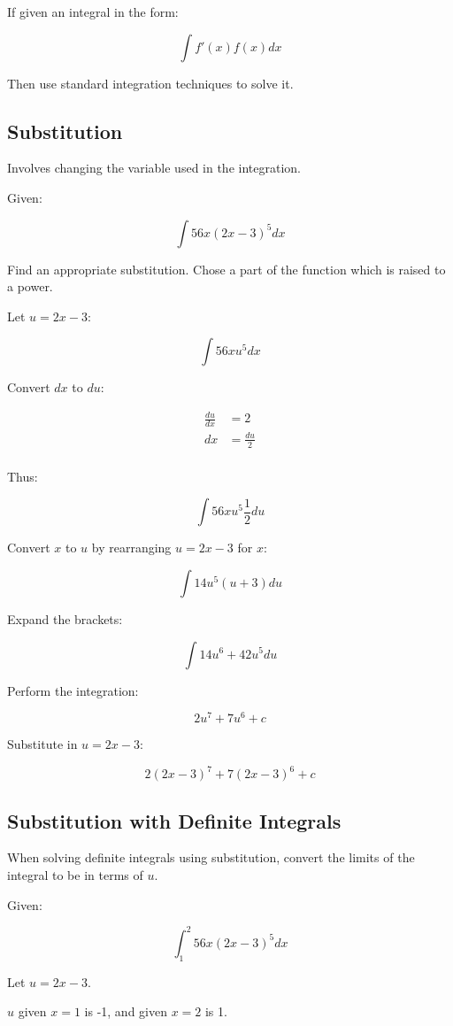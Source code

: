 \documentclass[a4paper,11pt]{article}
\begin{document}
If given an integral in the form:

$$
\int f'(x) f(x) dx
$$

Then use standard integration techniques to solve it.


\subsection{Substitution}

Involves changing the variable used in the integration.

Given:

$$
\int 56x(2x - 3)^5 dx
$$

Find an appropriate substitution. Chose a part of the function which is raised
to a power.

Let $u = 2x - 3$:

$$
\int 56xu^5 dx
$$

Convert $dx$ to $du$:

$$
\begin{aligned}
\frac{du}{dx} & = 2 \\
dx & = \frac{du}{2} \\
\end{aligned}
$$

Thus:

$$
\int 56xu^5 \frac{1}{2} du
$$

Convert $x$ to $u$ by rearranging $u = 2x - 3$ for $x$:

$$
\int 14u^5(u + 3) du
$$

Expand the brackets:

$$
\int 14u^6 + 42u^5 du
$$

Perform the integration:

$$
2u^7 + 7u^6 + c
$$

Substitute in $u = 2x - 3$:

$$
2(2x - 3)^7 + 7(2x - 3)^6 + c
$$


\subsection{Substitution with Definite Integrals}

When solving definite integrals using substitution, convert the limits of the
integral to be in terms of $u$.

Given:

$$
\int_1^2 56x(2x - 3)^5 dx
$$

Let $u = 2x - 3$.

$u$ given $x = 1$ is -1, and given $x = 2$ is 1.
\end{document}
